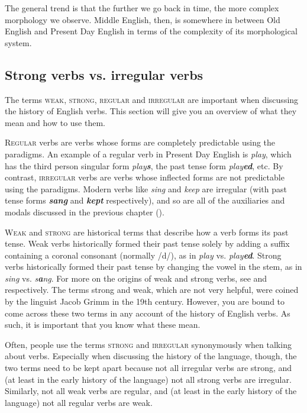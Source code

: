 The general trend is that the further we go back in time, the more complex morphology we observe. Middle English, then, is somewhere in between Old English and Present Day English in terms of the complexity of its morphological system.

\subsection{Strong verbs vs. irregular verbs}\label{ME-verbs}

The terms \textsc{weak}, \textsc{strong}, \textsc{regular} and \textsc{irregular} are important when discussing the history of English verbs. This section will give you an overview of what they mean and how to use them.

\textsc{Regular} verbs are verbs whose  forms are completely predictable using the paradigms. An example of a regular verb in Present Day English is \textit{play}, which has the third person singular form \textit{play\textbf{s}}, the past tense form \textit{play\textbf{ed}}, etc. By contrast, \textsc{irregular} verbs are verbs whose inflected forms are not predictable using the paradigms. Modern verbs like \textit{sing} and \textit{keep} are irregular (with past tense forms \textit{\textbf{sang}} and \textit{\textbf{kept}} respectively), and so are all of the auxiliaries and modals discussed in the previous chapter ().

\textsc{Weak} and \textsc{strong} are historical terms that describe how a verb forms its past tense. Weak verbs historically formed their past tense solely by adding a suffix containing a coronal consonant (normally /d/), as in \textit{play} vs. \textit{play\textbf{ed}}. Strong verbs historically formed their past tense by changing the vowel in the stem, as in \textit{sing} vs. \textit{s\textbf{a}ng}. For more on the origins of weak and strong verbs, see  and  respectively. The terms strong and weak, which are not very helpful, were coined by the linguist Jacob Grimm in the 19th century. However, you are bound to come across these two terms in any account of the history of English verbs. As such, it is important that you know what these mean.

Often, people use the terms \textsc{strong} and \textsc{irregular} synonymously when talking about verbs. Especially when discussing the history of the language, though, the two terms need to be kept apart because not all irregular verbs are strong, and (at least in the early history of the language) not all strong verbs are irregular. Similarly, not all weak verbs are regular, and (at least in the early history of the language) not all regular verbs are weak.

